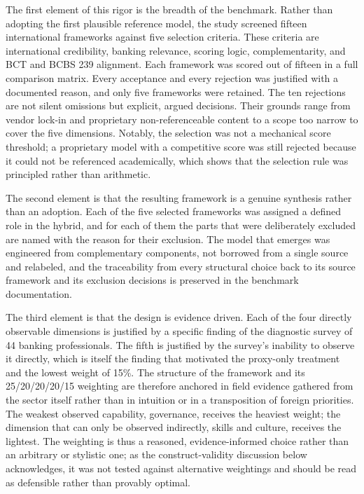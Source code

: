 The first element of this rigor is the breadth of the benchmark. Rather than adopting the first plausible reference model, the study screened fifteen international frameworks against five selection criteria. These criteria are international credibility, banking relevance, scoring logic, complementarity, and BCT and BCBS 239 alignment. Each framework was scored out of fifteen in a full comparison matrix. Every acceptance and every rejection was justified with a documented reason, and only five frameworks were retained. The ten rejections are not silent omissions but explicit, argued decisions. Their grounds range from vendor lock-in and proprietary non-referenceable content to a scope too narrow to cover the five dimensions. Notably, the selection was not a mechanical score threshold; a proprietary model with a competitive score was still rejected because it could not be referenced academically, which shows that the selection rule was principled rather than arithmetic.

The second element is that the resulting framework is a genuine synthesis rather than an adoption. Each of the five selected frameworks was assigned a defined role in the hybrid, and for each of them the parts that were deliberately excluded are named with the reason for their exclusion. The model that emerges was engineered from complementary components, not borrowed from a single source and relabeled, and the traceability from every structural choice back to its source framework and its exclusion decisions is preserved in the benchmark documentation.

The third element is that the design is evidence driven. Each of the four directly observable dimensions is justified by a specific finding of the diagnostic survey of 44 banking professionals. The fifth is justified by the survey's inability to observe it directly, which is itself the finding that motivated the proxy-only treatment and the lowest weight of 15\%. The structure of the framework and its 25/20/20/20/15 weighting are therefore anchored in field evidence gathered from the sector itself rather than in intuition or in a transposition of foreign priorities. The weakest observed capability, governance, receives the heaviest weight; the dimension that can only be observed indirectly, skills and culture, receives the lightest. The weighting is thus a reasoned, evidence-informed choice rather than an arbitrary or stylistic one; as the construct-validity discussion below acknowledges, it was not tested against alternative weightings and should be read as defensible rather than provably optimal.

